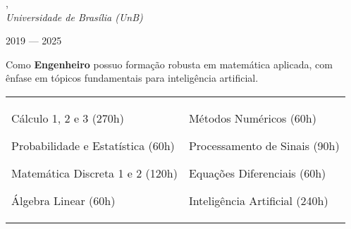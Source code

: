, \\
\textit{Universidade de Brasília (UnB)}\strut \hfill 2019 --- 2025\\

\vspace*{7pt}

Como \textbf{Engenheiro} possuo formação robusta em matemática aplicada, com ênfase em tópicos fundamentais para inteligência artificial.

\vspace*{7pt}

\begin{tabular}{@{}ll@{}}
  \begin{minipage}[t]{0.45\textwidth}
    \begin{zitemize}
      \item Cálculo 1, 2 e 3 (270h)
      \item Probabilidade e Estatística (60h)
      \item Matemática Discreta 1 e 2 (120h)
      \item Álgebra Linear (60h)
    \end{zitemize}
  \end{minipage}
  &
  \begin{minipage}[t]{0.45\textwidth}
    \begin{zitemize}
      \item Métodos Numéricos (60h)
      \item Processamento de Sinais (90h)
      \item Equações Diferenciais (60h)
      \item Inteligência Artificial (240h)
    \end{zitemize}
  \end{minipage}
\end{tabular}

\vspace*{7pt}
